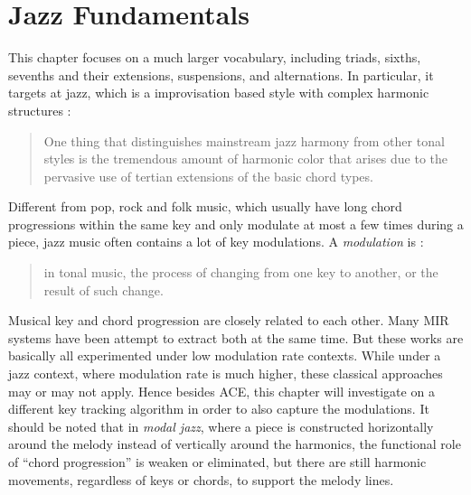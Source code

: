 \section{Jazz Fundamentals} \label{sec:5-jazzfund}
This chapter focuses on a much larger vocabulary, including triads, sixths, sevenths and their extensions, suspensions, and alternations. In particular, it targets at jazz, which is a improvisation based style with complex harmonic structures \cite{hojnackijazz}:
\begin{quote}
One thing that distinguishes mainstream jazz harmony from other tonal styles is the tremendous amount of harmonic color that arises due to the pervasive use of tertian extensions of the basic chord types.
\end{quote}
Different from pop, rock and folk music, which usually have long chord progressions within the same key and only modulate at most a few times during a piece, jazz music often contains a lot of key modulations. A {\it modulation} is \cite{randel1999harvard}:
\begin{quote}
in tonal music, the process of changing from one key to another, or the result of such change.
\end{quote}
Musical key and chord progression are closely related to each other. Many MIR systems \cite{catteau2007probabilistic,noland2009influences,mauch2010simultaneous,papadopoulos2012modeling} have been attempt to extract both at the same time. But these works are basically all experimented under low modulation rate contexts. While under a jazz context, where modulation rate is much higher, these classical approaches may or may not apply. Hence besides ACE, this chapter will investigate on a different key tracking algorithm in order to also capture the modulations. It should be noted that in {\it modal jazz}, where a piece is constructed horizontally around the melody instead of vertically around the harmonics, the functional role of ``chord progression'' is weaken or eliminated, but there are still harmonic movements, regardless of keys or chords, to support the melody lines.

